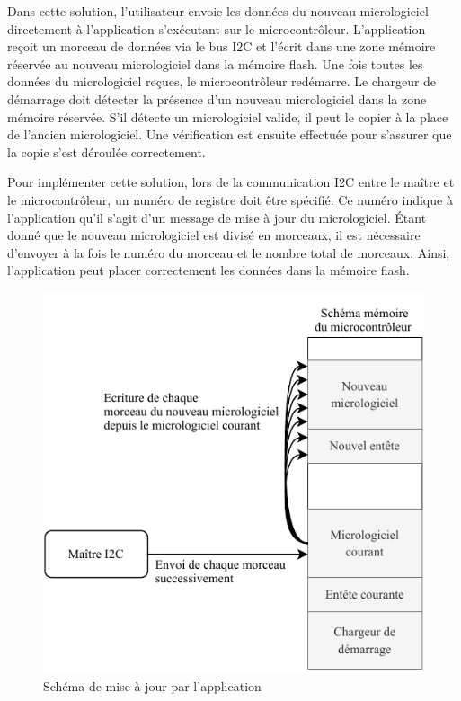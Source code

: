 Dans cette solution, l'utilisateur envoie les données du nouveau micrologiciel directement à l'application s'exécutant sur le microcontrôleur.
L'application reçoit un morceau de données via le bus I2C et l'écrit dans une zone mémoire réservée au nouveau micrologiciel dans la mémoire flash.
Une fois toutes les données du micrologiciel reçues, le microcontrôleur redémarre.
Le chargeur de démarrage doit détecter la présence d'un nouveau micrologiciel dans la zone mémoire réservée.
S'il détecte un micrologiciel valide, il peut le copier à la place de l'ancien micrologiciel.
Une vérification est ensuite effectuée pour s'assurer que la copie s'est déroulée correctement.

Pour implémenter cette solution, lors de la communication I2C entre le maître et le microcontrôleur, un numéro de registre doit être spécifié.
Ce numéro indique à l'application qu'il s'agit d'un message de mise à jour du micrologiciel.
Étant donné que le nouveau micrologiciel est divisé en morceaux, il est nécessaire d'envoyer à la fois le numéro du morceau et le nombre total de morceaux.
Ainsi, l'application peut placer correctement les données dans la mémoire flash.

\begin{figure}[H]
    \centering
    \includegraphics[scale=1.3]{./assets/figures/firmware_update.pdf}
    \caption{Schéma de mise à jour par l'application}
\end{figure}

